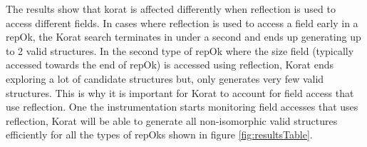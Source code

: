 \para
The results show that korat is affected differently when reflection is used to access different fields. In cases where reflection is used to access a field early in a repOk, the Korat search terminates in under a second and ends up generating up to 2 valid structures. In the second type of repOk where the size field (typically accessed towards the end of repOk) is accessed using reflection, Korat ends exploring a lot of candidate structures but, only generates very few valid structures. This is why it is important for Korat to account for field access that use reflection. One the instrumentation starts monitoring field accesses that uses reflection, Korat will be able to generate all non-isomorphic valid structures efficiently for all the types of repOks shown in figure \ref{fig:resultsTable}.

\begin{sidewaystable}[h]
\end{sidewaystable}

